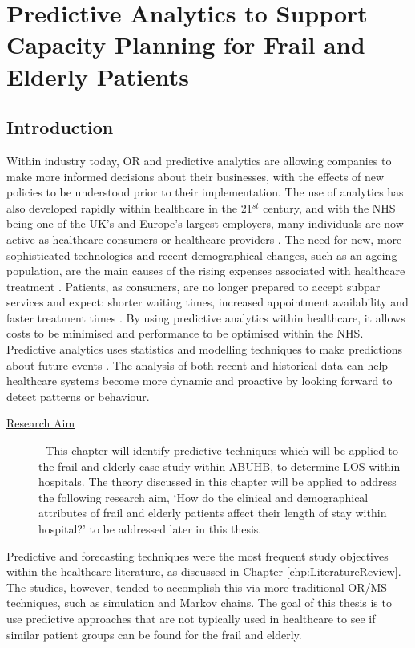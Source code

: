 \documentclass[../thesis.tex]{subfiles}
\begin{document}
\chapter{Predictive Analytics to Support Capacity Planning for Frail and Elderly Patients} \label{chp:predictive}

\section{Introduction}
Within industry today, OR and predictive analytics are allowing companies to make more informed decisions about their businesses, with the effects of new policies to be understood prior to their implementation. The use of analytics has also developed rapidly within healthcare in the 21$^{st}$ century, and with the NHS being one of the UK's and Europe's largest employers, many individuals are now active as healthcare consumers or healthcare providers \cite{NHSJobs2022}. The need for new, more sophisticated technologies and recent demographical changes, such as an ageing population, are the main causes of the rising expenses associated with healthcare treatment \cite{ONS2022}. Patients, as consumers, are no longer prepared to accept subpar services and expect: shorter waiting times, increased appointment availability and faster treatment times \cite{Aiken2021}. By using predictive analytics within healthcare, it allows costs to be minimised and performance to be optimised within the NHS. Predictive analytics uses statistics and modelling techniques to make predictions about future events \cite{Kumar2018}. The analysis of both recent and historical data can help healthcare systems become more dynamic and proactive by looking forward to detect patterns or behaviour.
\begin{description}
\item[\underline{Research Aim}] - This chapter will identify predictive techniques which will be applied to the frail and elderly case study within ABUHB, to determine LOS within hospitals. The theory discussed in this chapter will be applied to address the following research aim, `How do the clinical and demographical attributes of frail and elderly patients affect their length of stay within hospital?' to be addressed later in this thesis. 
\end{description}

Predictive and forecasting techniques were the most frequent study objectives within the healthcare literature, as discussed in Chapter \ref{chp:LiteratureReview}. The studies, however, tended to accomplish this via more traditional OR/MS techniques, such as simulation and Markov chains. The goal of this thesis is to use predictive approaches that are not typically used in healthcare to see if similar patient groups can be found for the frail and elderly.
\end{document}
